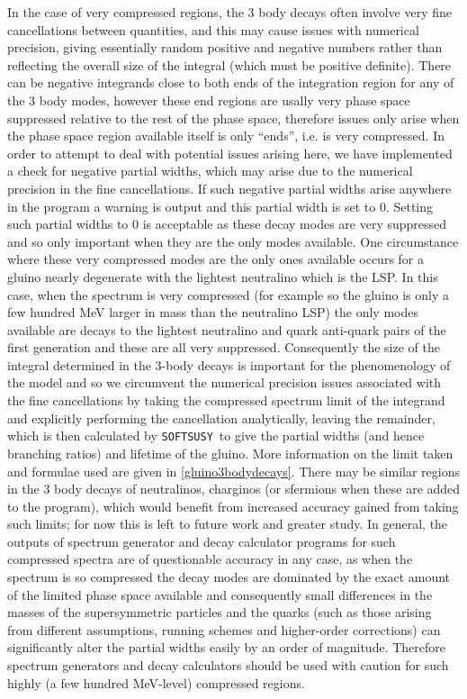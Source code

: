 \documentclass[final,3p,times]{elsarticle}
\def\SOFTSUSY{{\tt SOFTSUSY}}
\begin{document}
In the case of very compressed regions, the 3 body decays often involve very
fine cancellations between quantities, and this may cause issues with
numerical precision, giving essentially random positive and negative numbers
rather than reflecting the overall size of the integral (which must be
positive definite). There can be negative integrands close to both ends of the
integration region for any of the 3 body modes, however these end regions are
usally very phase space suppressed relative to the rest of the phase space,
therefore issues only arise when the phase space region available itself is
only ``ends'', i.e. is very compressed. In order to attempt to deal with
potential issues arising here, we have implemented a check for negative
partial widths, which may arise due to the numerical precision in the fine
cancellations. If such negative partial widths arise anywhere in the program a
warning is output and this partial width is set to 0. Setting such partial
widths to 0 is acceptable as these decay modes are very suppressed and so only
important when they are the only modes available. One circumstance where these
very compressed modes are the only ones available occurs for a gluino nearly
degenerate with the lightest neutralino which is the LSP. In this case, when
the spectrum is very compressed (for example so the gluino is only a few
hundred MeV larger in mass than the neutralino LSP) the only modes available
are decays to the lightest neutralino and quark anti-quark pairs of the first
generation and these are all very suppressed. Consequently the size of the
integral determined in the 3-body decays is important for the phenomenology of
the model and so we circumvent the numerical precision issues associated with
the fine cancellations by taking the compressed spectrum limit of the
integrand and explicitly performing the cancellation analytically, leaving the
remainder, which is then calculated by \SOFTSUSY~to give the partial widths
(and hence branching ratios) and lifetime of the gluino. More information on
the limit taken and formulae used are given in \ref{gluino3bodydecays}. There
may be similar regions in the 3 body decays of neutralinos, charginos (or
sfermions when these are added to the program), which would benefit from
increased accuracy gained from taking such limits; for now this is left to
future work and greater study. In general, the outputs of spectrum generator
and decay calculator programs for such compressed spectra are of questionable
accuracy in any case, as when the spectrum is so compressed the decay modes
are dominated by the exact amount of the limited phase space available and
consequently small differences in the masses of the supersymmetric particles
and the quarks (such as those arising from different assumptions, running
schemes and higher-order corrections) can significantly alter the partial
widths easily by an order of magnitude. Therefore spectrum generators and
decay calculators should be used with caution for such highly (a few hundred 
MeV-level) compressed regions.
\end{document}

